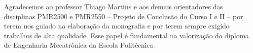 \begin{agradecimentos}
Agradecemos ao professor Thiago Martins e aos demais orientadores das disciplinas PMR2500 e PMR2550 -- Projeto de Conclusão do Curso I e II -- por terem nos guiado na elaboração da monografia e por terem sempre exigido trabalhos de alta qualidade. Esse papel é fundamental na valorização do diploma de Engenharia Mecatrônica da Escola Politécnica. 
\end{agradecimentos}